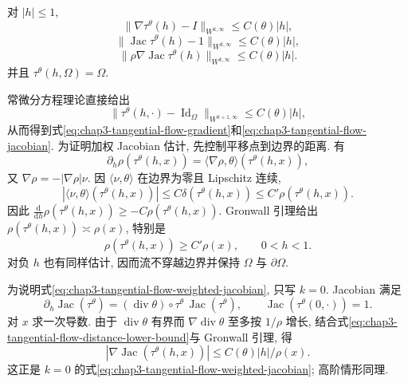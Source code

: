 \begin{Proposition}
\label{prop:chap3-tangential-flow-estimates}
对 $|h|\leq1$,
\begin{equation}
 \|\nabla\tau^\theta(h)-I\|_{W^{k,\infty}}\leq C(\theta)|h|,
 \label{eq:chap3-tangential-flow-gradient}
\end{equation}
\begin{equation}
 \|\operatorname{Jac}\tau^\theta(h)-1\|_{W^{k,\infty}}\leq C(\theta)|h|,
 \label{eq:chap3-tangential-flow-jacobian}
\end{equation}
\begin{equation}
 \|\rho\nabla\operatorname{Jac}\tau^\theta(h)\|_{W^{k,\infty}}
 \leq C(\theta)|h|.
 \label{eq:chap3-tangential-flow-weighted-jacobian}
\end{equation}
并且 $\tau^\theta(h,\Omega)=\Omega$.
\end{Proposition}

\begin{Proof}
常微分方程理论直接给出
\[
 \|\tau^\theta(h,\cdot)-\operatorname{Id}_\Omega\|_{W^{k+1,\infty}}
 \leq C(\theta)|h|,
\]
从而得到式\eqref{eq:chap3-tangential-flow-gradient}和\eqref{eq:chap3-tangential-flow-jacobian}. 为证明加权 Jacobian 估计, 先控制平移点到边界的距离. 有
\begin{equation}
 \partial_h\rho(\tau^\theta(h,x))
 =\langle\nabla\rho,\theta\rangle(\tau^\theta(h,x)),
 \label{eq:chap3-distance-along-tangential-flow}
\end{equation}
又 $\nabla\rho=-|\nabla\rho|\nu$. 因 $\langle\nu,\theta\rangle$ 在边界为零且 Lipschitz 连续,
\[
 |\langle\nu,\theta\rangle(\tau^\theta(h,x))|
 \leq C\delta(\tau^\theta(h,x))\leq C'\rho(\tau^\theta(h,x)).
\]
因此 $\frac{\mathrm d}{\mathrm dh}\rho(\tau^\theta(h,x))\geq-C\rho(\tau^\theta(h,x))$. Gronwall 引理给出 $\rho(\tau^\theta(h,x))\asymp\rho(x)$, 特别是
\begin{equation}
 \rho(\tau^\theta(h,x))\geq C'\rho(x),\qquad0<h<1.
 \label{eq:chap3-tangential-flow-distance-lower-bound}
\end{equation}
对负 $h$ 也有同样估计, 因而流不穿越边界并保持 $\Omega$ 与 $\partial\Omega$.

为说明式\eqref{eq:chap3-tangential-flow-weighted-jacobian}, 只写 $k=0$. Jacobian 满足
\[
 \partial_h\operatorname{Jac}(\tau^\theta)
 =(\operatorname{div}\theta)\circ\tau^\theta\,\operatorname{Jac}(\tau^\theta),
 \qquad\operatorname{Jac}(\tau^\theta(0,\cdot))=1.
\]
对 $x$ 求一次导数. 由于 $\operatorname{div}\theta$ 有界而 $\nabla\operatorname{div}\theta$ 至多按 $1/\rho$ 增长, 结合式\eqref{eq:chap3-tangential-flow-distance-lower-bound}与 Gronwall 引理, 得
\[
 |\nabla\operatorname{Jac}(\tau^\theta(h,x))|
 \leq C(\theta)|h|/\rho(x).
\]
这正是 $k=0$ 的式\eqref{eq:chap3-tangential-flow-weighted-jacobian}; 高阶情形同理.
\end{Proof}

